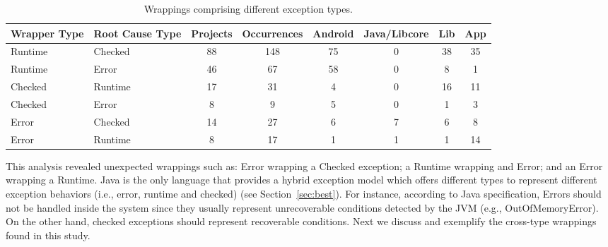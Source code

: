 \documentclass[conference]{IEEEtran}
\begin{document}
\begin{table}
  \centering
  \begin{tabular}{llcccccc}
    \hline
    \bfseries{Wrapper Type}  &  \bfseries{Root Cause Type} &  \bfseries{Projects}  &  \bfseries{Occurrences} & \textsf{Android} & \textsf{Java/Libcore} & \textsf{Lib} & \textsf{App}  \\
    \hline
      
      Runtime &  Checked   & 88 & 148 &  75  &  0   & 38 &  35 \\
      Runtime   &  Error   & 46  &  67    &  58  &  0   & 8  &  1   \\      
      Checked &  Runtime   & 17  & 31 & 4 &  0  & 16 &  11 \\
      Checked & Error      & 8 &  9  & 5  &  0  &  1 &  3  \\
      Error & Checked      & 14 &  27 &  6  &  7  &  6 &   8    \\
      Error & Runtime     & 8  &  17   & 1 &  1  & 1 &  14    \\

  \hline
  \end{tabular}
\caption{Wrappings comprising different exception types.}
\label{tab:wrappingandroid}
\end{table}



This analysis revealed unexpected wrappings such as: Error wrapping a Checked 
exception; a Runtime wrapping and Error; and an Error wrapping a Runtime.
Java is the only language that provides a hybrid exception model 
which offers  different types to represent different exception behaviors (i.e., error, 
runtime and checked) (see Section~\ref{sec:best}). For instance,
according to Java specification, Errors should not be handled inside the system 
since they usually represent unrecoverable conditions
detected by the JVM (e.g.,  OutOfMemoryError). On the other hand, checked exceptions should
represent recoverable conditions. Next we discuss and exemplify the cross-type wrappings
 found in this study.
\end{document}

